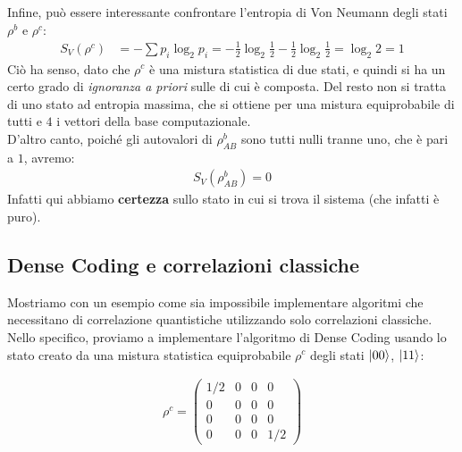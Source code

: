 \documentclass[../../InformazioneQuantistica.tex]{subfiles}
\begin{document}
Infine, può essere interessante confrontare l'entropia di Von Neumann degli stati $\rho^b$ e $\rho^c$:
\begin{align*}
S_V(\rho^c) &= -\sum p_i \log_2 p_i = -\frac{1}{2}\log_2 \frac{1}{2}-\frac{1}{2}\log_2 \frac{1}{2} = \log_2 2 = 1
\end{align*}
Ciò ha senso, dato che $\rho^c$ è una mistura statistica di due stati, e quindi si ha un certo grado di \textit{ignoranza a priori} sulle  di cui è composta. Del resto non si tratta di uno stato ad entropia massima, che si ottiene per una mistura equiprobabile di tutti e $4$ i vettori della base computazionale.\\
D'altro canto, poiché gli autovalori di $\rho_{AB}^b$ sono tutti nulli tranne uno, che è pari a $1$, avremo:
\begin{align*}
S_V(\rho_{AB}^b) = 0
\end{align*}
Infatti qui abbiamo \textbf{certezza} sullo stato in cui si trova il sistema (che infatti è puro).

\subsection{Dense Coding e correlazioni classiche}
Mostriamo con un esempio come sia impossibile implementare algoritmi che necessitano di correlazione quantistiche utilizzando solo correlazioni classiche.\\

Nello specifico, proviamo a implementare l'algoritmo di Dense Coding usando lo stato creato da una mistura statistica equiprobabile $\rho^c$ degli stati $\Ket{00}$, $\Ket{11}$:

\begin{align*}
\rho^c = \left( \begin{array}{cc|cc}1/2 & 0 & 0 & 0\\
0 & 0 & 0 & 0 \\ \hline
0 & 0 & 0 & 0 \\
0 & 0 & 0 & 1/2\end{array} \right)
\end{align*}
\end{document}
